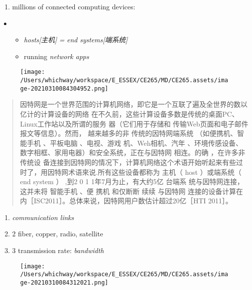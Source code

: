 \documentclass[
]{article}
\begin{document}
\begin{enumerate}
\def\labelenumi{\arabic{enumi}.}
\item
  millions of connected computing devices:
\end{enumerate}

\begin{itemize}
\item
  \begin{itemize}
  \item
    \emph{hosts{[}主机{]}} \emph{=} \emph{end systems{[}端系统{]}}
  \item
    running \emph{network apps}
  \end{itemize}
\end{itemize}

\begin{quote}
\end{quote}

\begin{figure}
\centering
\texttt{[image: /Users/whichway/workspace/E\_ESSEX/CE265/MD/CE265.assets/image-20210310084304952.png]}
\caption{}
\end{figure}

\begin{quote}
因特网是一个世界范围的计算机网络，即它是一个互联了遍及全世界的数以亿计的计算设备的网络
在不久前，这些计算设备多数是传统的桌面PC、Linux工作站以及所谓的服务
器（它们用于存储和 传输Web页面和电子邮件报文等信息）。然而，
越来越多的非 传统的因特网端系统 （如便携机、智能手机 、平板电脑
、电视、游戏 机、Weh相机、汽年
、环境传感设备、数字相框、家用电器）和安全系统，正在与因特网 相连。的确
，在许多非传统设
备连接到因特网的情况下，计算机网络这个术语开始听起来有些过时了，用因特网术语來说.所有这些设备都称为
主机（ host ）或端系统（ end system ） ,到2 0 1 1年7月为止，有大约5亿
台端系 统与因特网连接，这并未将 智能手机 、便 携机 和仅断断 续续
与因特网
连接的设备计算在内［ISC2011］。总体来说，因特网用户数估计超过20亿［HTI
2011］。
\end{quote}

\begin{enumerate}
\def\labelenumi{\arabic{enumi}.}
\item
  \emph{communication links}
\item
  2 fiber, copper, radio, satellite
\item
  3 transmission rate: \emph{bandwidth}
\end{enumerate}

\begin{figure}
\centering
\texttt{[image: /Users/whichway/workspace/E\_ESSEX/CE265/MD/CE265.assets/image-20210310084312021.png]}
\caption{}
\end{figure}
\end{document}
